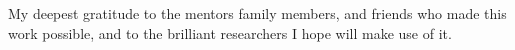 \leavevmode\vfill
\begin{center}
My deepest gratitude to the mentors family members, and friends who made this work possible,
and to the brilliant researchers I hope will make use of it.
\end{center}
\vfill